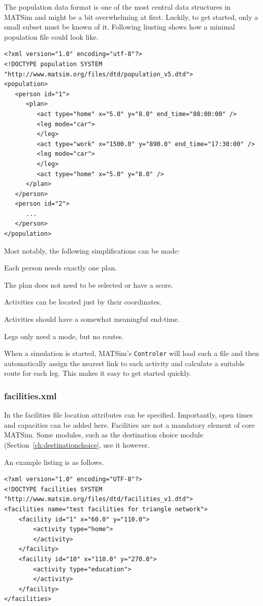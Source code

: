The population data format is one of the most central data structures in MATSim and might be a bit overwhelming at first. Luckily, to get started, only a small subset must be known of it. Following liusting shows how a minimal population file could look like. 

\begin{lstlisting}
<?xml version="1.0" encoding="utf-8"?> 
<!DOCTYPE population SYSTEM "http://www.matsim.org/files/dtd/population_v5.dtd"> 
<population> 
   <person id="1"> 
      <plan> 
         <act type="home" x="5.0" y="8.0" end_time="08:00:00" /> 
         <leg mode="car"> 
         </leg> 
         <act type="work" x="1500.0" y="890.0" end_time="17:30:00" /> 
         <leg mode="car"> 
         </leg> 
         <act type="home" x="5.0" y="8.0" /> 
      </plan> 
   </person> 
   <person id="2"> 
      ... 
   </person> 
</population>
\end{lstlisting}

Most notably, the following simplifications can be made:
\begin{compactitem}
\item Each person needs exactly one plan.
\item The plan does not need to be selected or have a score.
\item Activities can be located just by their coordinates.
\item Activities should have a somewhat meaningful end-time.
\item Legs only need a mode, but no routes.
\end{compactitem}
When a simulation is started, MATSim's \lstinline|Controler| will load such a file and then automatically assign the nearest link to each activity and calculate a suitable route for each leg. This makes it easy to get started quickly. 

\subsubsection{facilities.xml}
In the facilities file location attributes can be specified. Importantly, open times and capacities can be added here. Facilities are not a mandatory element of core MATSim. Some modules, such as the destination choice module (Section~\ref{ch:destinationchoice}, use it however.

An example listing is as follows.
\begin{lstlisting}
<?xml version="1.0" encoding="UTF-8"?>
<!DOCTYPE facilities SYSTEM "http://www.matsim.org/files/dtd/facilities_v1.dtd">
<facilities name="test facilities for triangle network">
	<facility id="1" x="60.0" y="110.0">
		<activity type="home">
		</activity>
	</facility>
	<facility id="10" x="110.0" y="270.0">
		<activity type="education">
		</activity>
	</facility>
</facilities>
\end{lstlisting}

